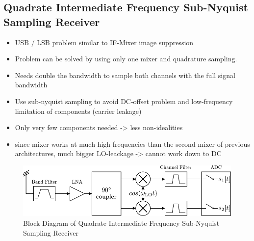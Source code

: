 \subsection{Quadrate Intermediate Frequency Sub-Nyquist Sampling Receiver}
\begin{itemize}
\item USB / LSB problem similar to IF-Mixer image suppression
\item Problem can be solved by using only one mixer and quadrature sampling.
\item Needs double the bandwidth to sample both channels with the full
  signal bandwidth
\item Use sub-nyquist sampling to avoid DC-offset problem and low-frequency
  limitation of components (carrier leakage)
\item Only very few components needed -> less non-idealities
\item since mixer works at much high frequencies than the second mixer of
  previous architectures, much bigger LO-leackage -> cannot work down to DC
\end{itemize}

\begin{figure}[ht]
  \centering
  \includegraphics[width=\textwidth]{figures/quad_if_rx_block_diagram}
  \caption{Block Diagram of Quadrate Intermediate Frequency Sub-Nyquist Sampling Receiver}
  \label{fig:rx_2_bd}
\end{figure}

